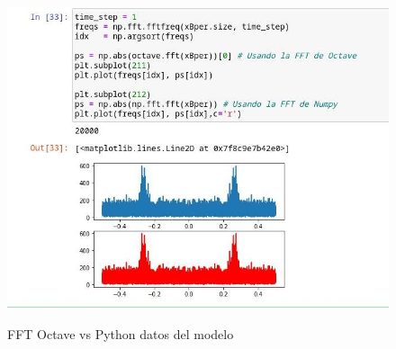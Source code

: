 \documentclass[12pt]{article}
\begin{document}
\begin{refsegment}

    \begin{figure}[H]
        \centering
        \caption{FFT Octave vs Python datos del modelo}
            \includegraphics[width=16cm]{comprobacion_resultados/finales/comFFT2.png}
        \label{img:FFTSensores}
    \end{figure}
    \endgroup


    


\end{refsegment}

	\newpage
	\printbibliography[segment=1,title={\centering{REFERENCIAS BIBLIOGRÁFICAS}}]
    \nocite{*}
    \printbibliography[notkeyword={b1},title={\centering{BIBLIOGRAFÍA}}]
    
    
\end{document}
